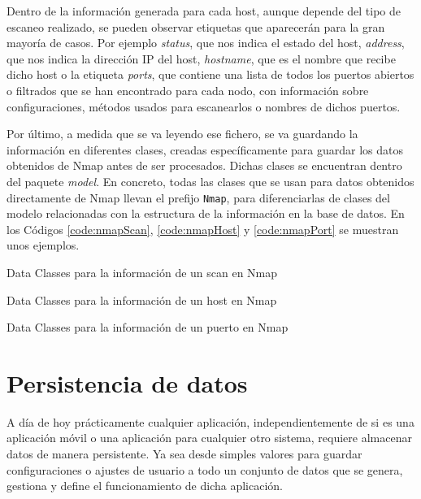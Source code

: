 Dentro de la información generada para cada host, aunque depende del tipo de escaneo realizado, se pueden observar etiquetas que aparecerán para la gran mayoría de casos. Por ejemplo \textit{status}, que nos indica el estado del host, \textit{address}, que nos indica la dirección IP del host, \textit{hostname}, que es el nombre que recibe dicho host o la etiqueta \textit{ports}, que contiene una lista de todos los puertos abiertos o filtrados que se han encontrado para cada nodo, con información sobre configuraciones, métodos usados para escanearlos o nombres de dichos puertos.

Por último, a medida que se va leyendo ese fichero, se va guardando la información en diferentes clases, creadas específicamente para guardar los datos obtenidos de Nmap antes de ser procesados. Dichas clases se encuentran dentro del paquete \textit{model}. En concreto, todas las clases que se usan para datos obtenidos directamente de Nmap llevan el prefijo \texttt{Nmap}, para diferenciarlas de clases del modelo relacionadas con la estructura de la información en la base de datos. En los Códigos \ref{code:nmapScan}, \ref{code:nmapHost} y \ref{code:nmapPort} se muestran unos ejemplos.

\begin{code}
	\caption{Data Classes para la información de un scan en Nmap}
	\label{code:nmapScan}
	
\end{code}

\begin{code}
	\caption{Data Classes para la información de un host en Nmap}
	\label{code:nmapHost}
	
\end{code}

\begin{code}
	\caption{Data Classes para la información de un puerto en Nmap}
	\label{code:nmapPort}
	
\end{code}

\section{Persistencia de datos}

A día de hoy prácticamente cualquier aplicación, independientemente de si es una aplicación móvil o una aplicación para cualquier otro sistema, requiere almacenar datos de manera persistente. Ya sea desde simples valores para guardar configuraciones o ajustes de usuario a todo un conjunto de datos que se genera, gestiona y define el funcionamiento de dicha aplicación.

